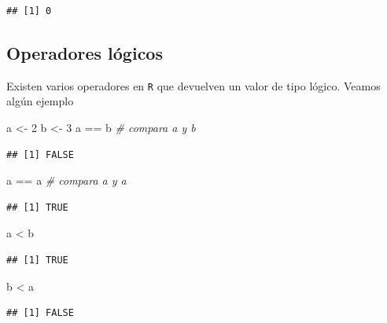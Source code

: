 \documentclass[
]{book}
\newenvironment{Shaded}{\begin{snugshade}}{\end{snugshade}}
\newcommand{\CommentTok}[1]{\textcolor[rgb]{0.56,0.35,0.01}{\textit{#1}}}
\newcommand{\DecValTok}[1]{\textcolor[rgb]{0.00,0.00,0.81}{#1}}
\newcommand{\NormalTok}[1]{#1}
\newcommand{\OtherTok}[1]{\textcolor[rgb]{0.56,0.35,0.01}{#1}}
\newcommand{\SpecialCharTok}[1]{\textcolor[rgb]{0.00,0.00,0.00}{#1}}
\theoremstyle{break}
\theoremstyle{nonumberplain}
\begin{document}
\begin{verbatim}
## [1] 0
\end{verbatim}

\hypertarget{operadores-luxf3gicos}{%
\subsection{Operadores lógicos}\label{operadores-luxf3gicos}}

Existen varios operadores en \texttt{R} que devuelven un valor de tipo lógico. Veamos algún ejemplo

\begin{Shaded}
\begin{Highlighting}[]
\NormalTok{a }\OtherTok{\textless{}{-}} \DecValTok{2}
\NormalTok{b }\OtherTok{\textless{}{-}} \DecValTok{3}
\NormalTok{a }\SpecialCharTok{==}\NormalTok{ b  }\CommentTok{\# compara a y b}
\end{Highlighting}
\end{Shaded}

\begin{verbatim}
## [1] FALSE
\end{verbatim}

\begin{Shaded}
\begin{Highlighting}[]
\NormalTok{a }\SpecialCharTok{==}\NormalTok{ a  }\CommentTok{\# compara a y a}
\end{Highlighting}
\end{Shaded}

\begin{verbatim}
## [1] TRUE
\end{verbatim}

\begin{Shaded}
\begin{Highlighting}[]
\NormalTok{a }\SpecialCharTok{\textless{}}\NormalTok{ b}
\end{Highlighting}
\end{Shaded}

\begin{verbatim}
## [1] TRUE
\end{verbatim}

\begin{Shaded}
\begin{Highlighting}[]
\NormalTok{b }\SpecialCharTok{\textless{}}\NormalTok{ a}
\end{Highlighting}
\end{Shaded}

\begin{verbatim}
## [1] FALSE
\end{verbatim}
\end{document}
